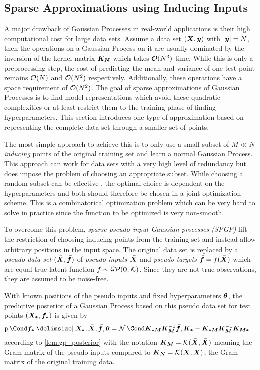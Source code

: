 \subsection{Sparse Approximations using Inducing Inputs}
A major drawback of Gaussian Processes in real-world applications is their high computational cost for large data sets.
Assume a data set $(\bm{X}, \bm{y})$ with $\vert\bm{y}\vert = N$, then the operations on a Gaussian Process on it are usually dominated by the inversion of the kernel matrix $\bm{K_N}$ which takes $\operatorname{\mathcal{O}}(N^3)$ time.
While this is only a preprocessing step, the cost of predicting the mean and variance of one test point remains $\operatorname{\mathcal{O}}(N)$ and $\operatorname{\mathcal{O}}(N^2)$ respectively.
Additionally, these operations have a space requirement of $\operatorname{\mathcal{O}}(N^2)$.
The goal of sparse approximations of Gaussian Processes is to find model representations which avoid these quadratic complexities or at least restrict them to the training phase of finding hyperparameters.
This section introduces one type of approximation based on representing the complete data set through a smaller set of points.

The most simple approach to achieve this is to only use a small subset of $M \ll N$ \emph{inducing} points of the original training set and learn a normal Gaussian Process.
This approach can work for data sets with a very high level of redundancy but does impose the problem of choosing an appropriate subset.
While choosing a random subset can be effective \cite{snelson_flexible_2007}, the optimal choice is dependent on the hyperparameters and both should therefore be chosen in a joint optimization scheme.
This is a combinatorical optimization problem which can be very hard to solve in practice since the function to be optimized is very non-smooth.

To overcome this problem, \emph{sparse pseudo input Gaussian processes (SPGP)} \cite{snelson_flexible_2007} lift the restriction of choosing inducing points from the training set and instead allow arbitrary positions in the input space.
The original data set is replaced by a \emph{pseudo data set} $(\bar{\bm{X}}, \bar{\bm{f}})$ of \emph{pseudo inputs} $\bar{\bm{X}}$ and \emph{pseudo targets} $\bar{\bm{f}} = f(\bar{\bm{X}})$ which are equal true latent function $f \sim \operatorname{\mathcal{GP}}(\bm{0}, \operatorname{\mathcal{K}})$.
Since they are not true observations, they are assumed to be noise-free.

With known positions of the pseudo inputs and fixed hyperparameters $\bm{\theta}$, the predictive posterior of a Gaussian Process based on this pseudo data set for test points $(\bm{X_\ast}, \bm{f_\ast})$ is given by
\begin{align}
    \Prob{\mat{f_\ast} \given \mat{X_\ast}, \ps{\mat{X}}, \ps{\mat{f}}, \mat{\theta}} &= \Gaussian{\mat{K_{\ast M}}\mat{K_M}^{-1} \ps{\mat{f}}, \mat{K_\ast} - \mat{K_{\ast M}} \mat{K_M}^{-1} \mat{K_{M \ast}}}
\end{align}
according to \cref{lem:gp_posterior} with the notation $\bm{K_M} = \operatorname{\mathcal{K}}(\bar{\bm{X}}, \bar{\bm{X}})$ meaning the Gram matrix of the pseudo inputs compared to $\bm{K_N} = \operatorname{\mathcal{K}}(\bm{X}, \bm{X})$, the Gram matrix of the original training data.

